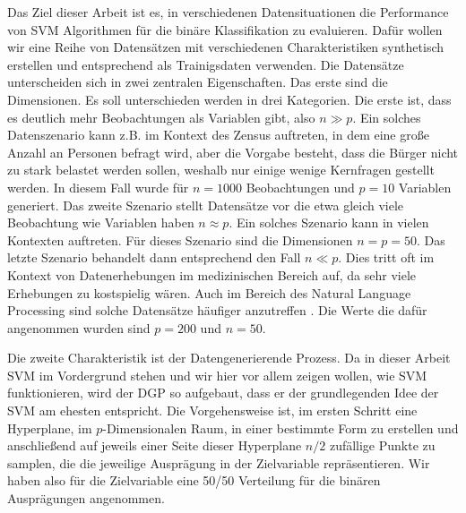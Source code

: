 \documentclass[
]{article}
\begin{document}
Das Ziel dieser Arbeit ist es, in verschiedenen Datensituationen die
Performance von SVM Algorithmen für die binäre Klassifikation zu
evaluieren. Dafür wollen wir eine Reihe von Datensätzen mit
verschiedenen Charakteristiken synthetisch erstellen und entsprechend
als Trainigsdaten verwenden. Die Datensätze unterscheiden sich in zwei
zentralen Eigenschaften. Das erste sind die Dimensionen. Es soll
unterschieden werden in drei Kategorien. Die erste ist, dass es deutlich
mehr Beobachtungen als Variablen gibt, also \(n \gg p\). Ein solches
Datenszenario kann z.B. im Kontext des Zensus auftreten, in dem eine
große Anzahl an Personen befragt wird, aber die Vorgabe besteht, dass
die Bürger nicht zu stark belastet werden sollen, weshalb nur einige
wenige Kernfragen gestellt werden. In diesem Fall wurde für \(n=1000\)
Beobachtungen und \(p=10\) Variablen generiert. Das zweite Szenario
stellt Datensätze vor die etwa gleich viele Beobachtung wie Variablen
haben \(n \approx p\). Ein solches Szenario kann in vielen Kontexten
auftreten. Für dieses Szenario sind die Dimensionen \(n=p=50\). Das
letzte Szenario behandelt dann entsprechend den Fall \(n \ll p\). Dies
tritt oft im Kontext von Datenerhebungen im medizinischen Bereich auf,
da sehr viele Erhebungen zu kostspielig wären. Auch im Bereich des
Natural Language Processing sind solche Datensätze häufiger anzutreffen
\parencite{scholzComparisonClassificationMethods2021}. Die Werte die
dafür angenommen wurden sind \(p=200\) und \(n=50\).

Die zweite Charakteristik ist der Datengenerierende Prozess. Da in
dieser Arbeit SVM im Vordergrund stehen und wir hier vor allem zeigen
wollen, wie SVM funktionieren, wird der DGP so aufgebaut, dass er der
grundlegenden Idee der SVM am ehesten entspricht. Die Vorgehensweise
ist, im ersten Schritt eine Hyperplane, im \(p\)-Dimensionalen Raum, in
einer bestimmte Form zu erstellen und anschließend auf jeweils einer
Seite dieser Hyperplane \(n/2\) zufällige Punkte zu samplen, die die
jeweilige Ausprägung in der Zielvariable repräsentieren. Wir haben also
für die Zielvariable eine 50/50 Verteilung für die binären Ausprägungen
angenommen.
\end{document}
